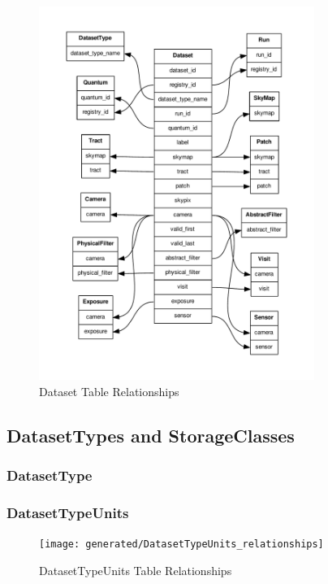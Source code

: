 \documentclass[DM,toc]{lsstdoc}
\begin{document}
\begin{figure}
    \centering
    \includegraphics[width=0.8\textwidth]{generated/Dataset_relationships}
    \caption{Dataset Table Relationships}
    \label{rel:Dataset}
\end{figure}

\subsection{DatasetTypes and StorageClasses}
\label{sec:datasettypes-and-storageclasses}

\subsubsection*{DatasetType}
\label{tbl:DatasetType}
{
    \footnotesize
    
}

\subsubsection*{DatasetTypeUnits}
\label{tbl:DatasetTypeUnits}
{
    \footnotesize
    
}

\begin{figure}
    \centering
    \texttt{[image: generated/DatasetTypeUnits\_relationships]}
    \caption{DatasetTypeUnits Table Relationships}
    \label{rel:DatasetTypeUnits}
\end{figure}
\end{document}
